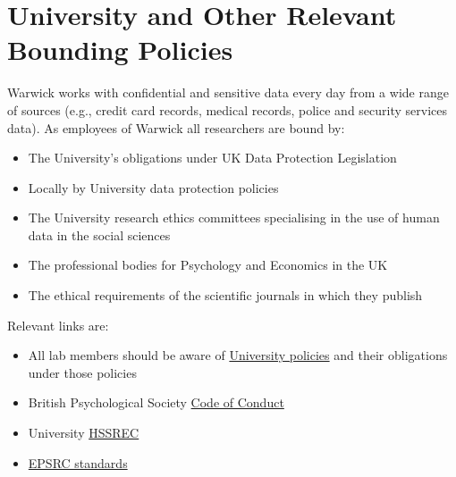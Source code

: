 \documentclass[doc]{apa6}
\begin{document}
\section{University and Other Relevant Bounding Policies}

Warwick works with confidential and sensitive data every day from a wide range of sources (e.g., credit card records, medical records, police and security services data). As employees of Warwick all researchers are bound by:

\begin{itemize}
	\item The University's obligations under UK Data Protection Legislation
	\item Locally by University data protection policies
	\item The University research ethics committees specialising in the use of human data in the social sciences
	\item The professional bodies for Psychology and Economics in the UK
	\item The ethical requirements of the scientific journals in which they publish
\end{itemize}

Relevant links are:

\begin{itemize}
	\item All lab members should be aware of \href{https://warwick.ac.uk/services/idc/}{University policies} and their obligations under those policies
	\item British Psychological Society \href{https://www.bps.org.uk/news-and-policy/bps-code-ethics-and-conduct}{Code of Conduct}
	\item University \href{http://www2.warwick.ac.uk/services/ris/research\_integrity/researchethicscommittees/hssrec/}{HSSREC}
	\item \href{https://epsrc.ukri.org/files/aboutus/standards/clarificationsofexpectationsresearchdatamanagement/}{EPSRC standards}
\end{itemize}


%

\end{document}

